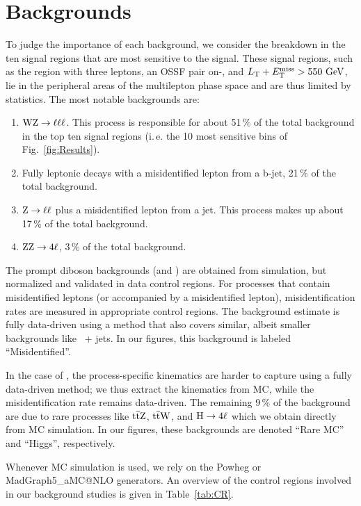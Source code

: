 \chapter{Backgrounds}
\label{sec:backgrounds}

To judge the importance of each background, we consider the breakdown in the ten signal regions that are most sensitive to the signal. These signal regions, such as the region with three leptons, an OSSF pair on-\Z, and $L_\textrm{T} + E_{\mathrm{T}}^{\text{miss}} > 550\,\,\text{Ge\hspace{-.08em}V}$, lie in the peripheral areas of the multilepton phase space and are thus limited by statistics. The most notable backgrounds are:
\begin{enumerate}
	\item $\mathrm{W}\mathrm{Z} \to \ell\ell\ell$. This process is responsible for about 51\,\% of the total background in the top ten signal regions (i.\,e. the 10 most sensitive bins of Fig.~\ref{fig:Results}).
	\item Fully leptonic \ttbar decays with a misidentified lepton from a b-jet, 21\,\% of the total background.
	\item $\mathrm{Z} \to \ell\ell$ plus a misidentified lepton from a jet. This process makes up about 17\,\% of the total background.
	\item $\mathrm{Z}\mathrm{Z} \to 4\ell$, 3\,\% of the total background.
\end{enumerate}

The prompt diboson backgrounds (\WZ and \ZZ) are obtained from simulation, but normalized and validated in data control regions. For processes that contain misidentified leptons (\Z or \ttbar accompanied by a misidentified lepton), misidentification rates are measured in appropriate control regions. The \Z background estimate is fully data-driven using a method that also covers similar, albeit smaller backgrounds like \PW\PW\ + jets. In our figures, this background is labeled ``Misidentified''.

In the case of \ttbar, the process-specific kinematics are harder to capture using a fully data-driven method; we thus extract the kinematics from MC, while the misidentification rate remains data-driven. The remaining 9\,\% of the background are due to rare processes like $\mathrm{t}\overline{\mathrm{t}}\mathrm{Z}$, $\mathrm{t}\overline{\mathrm{t}}\mathrm{W}$, and $\mathrm{H} \to 4\ell$ which we obtain directly from MC simulation. In our figures, these backgrounds are denoted ``Rare MC'' and ``Higgs'', respectively.

Whenever MC simulation is used, we rely on the Powheg or MadGraph5\_aMC@NLO generators. An overview of the control regions involved in our background studies is given in Table~\ref{tab:CR}.

